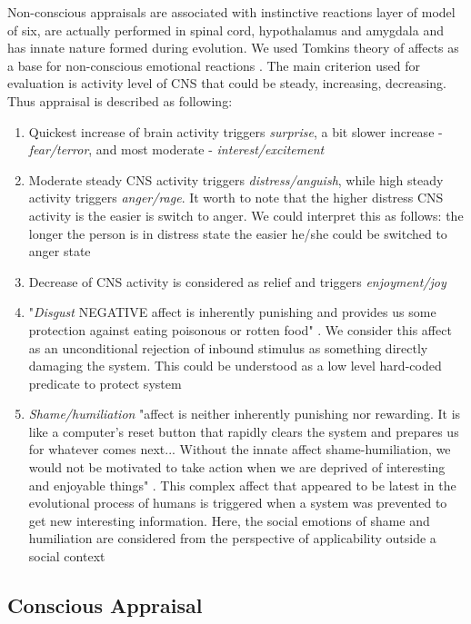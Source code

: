 Non-conscious appraisals are associated with instinctive reactions layer of model of six, are actually performed in spinal cord, hypothalamus and amygdala and has innate nature formed during evolution. We used Tomkins theory of affects as a base for non-conscious emotional reactions \cite{primer_affect_psychology}. The main criterion used for evaluation is activity level of CNS that could be steady, increasing, decreasing. Thus appraisal is described as following:

\begin{enumerate}
 \item  Quickest increase of brain activity triggers \emph{surprise}, a bit slower increase - \emph{fear/terror}, and most moderate - \emph{interest/excitement}
 \item  Moderate steady CNS activity triggers \emph{distress/anguish}, while high steady activity triggers \emph{anger/rage}. It worth to note that the higher distress CNS activity is the easier is switch to anger. We could interpret this as follows: the longer the person is in distress state the easier he/she could be switched to anger state
 \item  Decrease of CNS activity is considered as relief and triggers \emph{enjoyment/joy}
 \item  "\emph{Disgust} NEGATIVE affect is inherently punishing and provides us some protection against eating poisonous or rotten food" \cite{primer_affect_psychology}. We consider this affect as an unconditional rejection of inbound stimulus as something directly damaging the system. This could be understood as a low level hard-coded predicate to protect system
 \item  \emph{Shame/humiliation} "affect is neither inherently punishing nor rewarding. It is like a computer’s reset button that rapidly clears the system and prepares us for whatever comes next... Without the innate affect shame-humiliation, we would not be motivated to take action when we are deprived of interesting and enjoyable things" \cite{primer_affect_psychology}. This complex affect that appeared to be latest in the evolutional process of humans is triggered when a system was prevented to get new interesting information. Here, the social emotions of shame and humiliation are considered from the perspective of applicability outside a social context
\end{enumerate}

\subsection{Conscious Appraisal}

